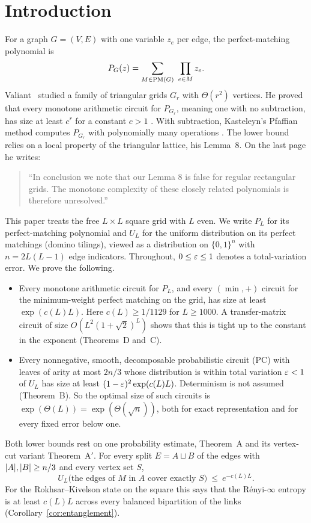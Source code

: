 \section{Introduction}\label{sec:intro}

For a graph $G=(V,E)$ with one variable $z_e$ per edge, the perfect-matching polynomial is
\[
  P_G(z)=\sum_{M\in\mathrm{PM}(G)}\ \prod_{e\in M} z_e .
\]
Valiant~\cite{Valiant80,Valiant79} studied a family of triangular grids $G_r$ with $\Theta(r^2)$ vertices. He proved that every monotone arithmetic circuit for $P_{G_r}$, meaning one with no subtraction, has size at least $c^r$ for a constant $c>1$ \cite[Thm.~1]{Valiant80}. With subtraction, Kasteleyn's Pfaffian method computes $P_{G_r}$ with polynomially many operations \cite[Thm.~2]{Valiant80}. The lower bound relies on a local property of the triangular lattice, his Lemma~8. On the last page he writes:
\begin{quote}
``In conclusion we note that our Lemma 8 is false for regular rectangular grids. The monotone complexity of these closely related polynomials is therefore unresolved.'' \cite[p.~313]{Valiant80}
\end{quote}

This paper treats the free $L\times L$ square grid with $L$ even. We write $P_L$ for its perfect-matching polynomial and $U_L$ for the uniform distribution on its perfect matchings (domino tilings), viewed as a distribution on $\{0,1\}^n$ with $n=2L(L-1)$ edge indicators. Throughout, $0\le\varepsilon\le1$ denotes a total-variation error. We prove the following.
\begin{itemize}
\item Every monotone arithmetic circuit for $P_L$, and every $(\min,+)$ circuit for the minimum-weight perfect matching on the grid, has size at least $\exp(c(L)L)$. Here $c(L)\ge 1/1129$ for $L\ge1000$. A transfer-matrix circuit of size $O(L^2(1+\sqrt2)^L)$ shows that this is tight up to the constant in the exponent (Theorems~D and~C).
\item Every nonnegative, smooth, decomposable probabilistic circuit (PC) with leaves of arity at most $2n/3$ whose distribution is within total variation $\varepsilon<1$ of $U_L$ has size at least $(1-\varepsilon)^2\exp(c(L)L)$. Determinism is not assumed (Theorem~B). So the optimal size of such circuits is $\exp(\Theta(L))=\exp(\Theta(\sqrt n))$, both for exact representation and for every fixed error below one.
\end{itemize}
Both lower bounds rest on one probability estimate, Theorem~A and its vertex-cut variant Theorem~A$'$. For every split $E=A\sqcup B$ of the edges with $\lvert A\rvert,\lvert B\rvert\ge n/3$ and every vertex set $S$,
\[
  U_L\bigl(\text{the edges of } M \text{ in } A \text{ cover exactly } S\bigr)\ \le\ e^{-c(L)L}.
\]
For the Rokhsar--Kivelson state on the square this says that the R\'enyi-$\infty$ entropy is at least $c(L)L$ across every balanced bipartition of the links (Corollary~\ref{cor:entanglement}).

